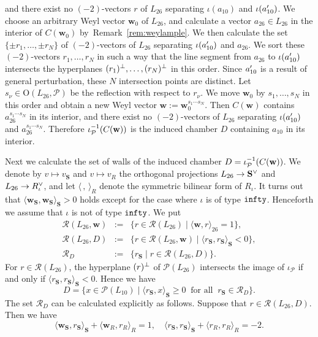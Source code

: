 \documentclass{amsart}
\numberwithin{equation}{section}
\numberwithin{table}{section}
\numberwithin{figure}{section}
\newcommand{\PPP}{\mathord{\mathcal P}}
\newcommand{\RRR}{\mathord{\mathcal R}}
\newcommand{\set}[2]{\{ {#1}\mid {#2}  \}}
\newcommand{\sprime}{\sp\prime}
\newcommand{\sperp}{\sp{\perp}}
\newcommand{\dual}{\sp{\vee}}
\newcommand{\inv}{\sp{-1}}
\newcommand{\OG}{\mathord{\mathrm{O}}}
\newcommand{\weyl}{\mathord{\mathbf w}}
\newcommand{\intfS}[1]{\langle #1\rangle_{\SS}}
\newcommand{\intfR}[1]{\langle #1\rangle_{R}}
\newcommand{\intfLL}[1]{\langle #1\rangle_{26}}
\newcommand{\OGP}[1]{\OG(#1, \PPP)}
\renewcommand{\SS}{\mathbf{S}}
\begin{document}
and  there exist no $(-2)$-vectors $r$ of $L_{26}$
separating $\iota(a_{10})$ and $\iota(a_{10}\sprime)$.
We  choose an arbitrary  Weyl vector $\weyl_0$ of $L_{26}$,
and calculate a vector $a_{26}\in L_{26}$
in the interior of $C(\weyl_0)$
by~Remark~\ref{rem:weylample}.
We then calculate the set $\{\pm r_1, \dots, \pm r_N\}$
of $(-2)$-vectors of $L_{26}$
separating $\iota(a_{10}\sprime)$ and $a_{26}$.
We sort these $(-2)$-vectors  $r_1, \dots, r_N$
in such a way that the line segment
from $a_{26}$ to $\iota(a_{10}\sprime)$
intersects the hyperplanes $(r_1)\sperp, \dots, (r_N)\sperp$ in this order.
Since $a_{10}\sprime$ is a result of  general perturbation,
these $N$ intersection points
are distinct.
Let $s_{\nu}\in \OGP{L_{26}}$ be the reflection with respect to $r_{\nu}$.
We  move $\weyl_0$   by $s_1, \dots, s_N$ in this order and obtain a new Weyl vector
$\weyl:=\weyl_0^{s_1\cdots s_N}$.
Then $C(\weyl)$ contains $a_{26}^{s_1\cdots s_N}$ in its interior,
and there exist no $(-2)$-vectors of $L_{26}$ separating
$\iota(a_{10}\sprime)$ and $a_{26}^{s_1\cdots s_N}$.
Therefore $\iota_{\PPP}\inv (C(\weyl))$ is the induced chamber $D$ containing $a_{10}$
in its interior.
%
\par
Next we calculate the set of walls of the induced chamber $D=\iota_{\PPP}\inv  (C(\weyl))$.
We denote by $v\mapsto v_{\SS}$ and $v\mapsto v_R$
the orthogonal projections $L_{26}\to \SS\dual$ and $L_{26}\to R_{\iota}\dual$,
and let $\intfR{\,,\,}$ denote the symmetric bilinear form  of $R_{\iota}$.
It turns out that  $\intfS{\weyl_{\SS}, \weyl_{\SS}}>0$ holds
except for the case where $\iota$ is of type  ${\tt infty}$.
Henceforth we assume that $\iota$ is not of type  ${\tt infty}$.
We put
%
\begin{eqnarray*}
\RRR(L_{26}, \weyl) &:=&\set{r\in \RRR(L_{26})}{\intfLL{\weyl, r}=1}, \\
\RRR(L_{26}, D) &:=&\set{r\in  \RRR(L_{26}, \weyl)}{\intfS{r_{\SS}, r_{\SS}}<0}, \\
\RRR_D&:=&\set{r_{\SS}}{ r\in \RRR(L_{26}, D)}.
\end{eqnarray*}
%
For $r\in \RRR(L_{26})$,
the hyperplane $(r)\sperp$ of $\PPP(L_{26})$
intersects  the image of $\iota_{\PPP}$
if and only if $\intfS{r_{\SS}, r_{\SS}}<0$.
Hence we have
\[
D=\set{x\in \PPP(L_{10})}{\intfS{r_{\SS}, x}\ge 0\;\;\textrm{for all}\;\; r_{\SS}\in \RRR_D}.
\]
The set $\RRR_D$ can be calculated explicitly as follows.
Suppose that
 $r\in \RRR(L_{26}, D)$.
Then we have
\[
\intfS{\weyl_{\SS}, r_{\SS}}+\intfR{\weyl_R, r_R}=1,
\quad
\intfS{r_{\SS}, r_{\SS}}+\intfR{r_R, r_R}=-2.
\]
\end{document}
